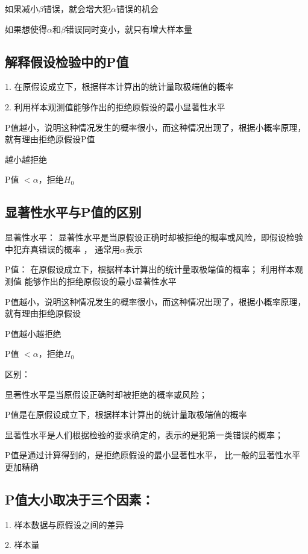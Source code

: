 \documentclass[UTF8,10pt]{book}
\begin{document}
{    如果减小$\beta$错误，就会增大犯$\alpha$错误的机会 
    
    如果想使得$\alpha$和$\beta$错误同时变小，就只有增大样本量

    \subsection{解释假设检验中的P值}	
    1. 在原假设成立下，根据样本计算出的统计量取极端值的概率 
    
    2. 利用样本观测值能够作出的拒绝原假设的最小显著性水平 
    
    P值越小，说明这种情况发生的概率很小，而这种情况出现了，根据小概率原理，
    就有理由拒绝原假设P值
    
    越小越拒绝
    
    P值 $< \alpha$，拒绝$H_0$

    \subsection{显著性水平与P值的区别}	
    显著性水平： 显著性水平是当原假设正确时却被拒绝的概率或风险，即假设检验中犯弃真错误的概率  ，   通常用$\alpha$表示 
    
    P值：    在原假设成立下，根据样本计算出的统计量取极端值的概率；    利用样本观测值 能够作出的拒绝原假设的最小显著性水平 
    
    P值越小，说明这种情况发生的概率很小，而这种情况出现了，根据小概率原理，
    就有理由拒绝原假设
    
    P值越小越拒绝
    
    P值 $ < \alpha$，拒绝$H_0$ 
    
    区别： 
    
    显著性水平是当原假设正确时却被拒绝的概率或风险；
    
    P值是在原假设成立下，根据样本计算出的统计量取极端值的概率
    
    显著性水平是人们根据检验的要求确定的，表示的是犯第一类错误的概率；
    
    P值是通过计算得到的，是拒绝原假设的最小显著性水平，
    比一般的显著性水平更加精确
    
    \subsection{P值大小取决于三个因素： }
    
    1. 样本数据与原假设之间的差异 
    
    2. 样本量 

}
\end{document}
